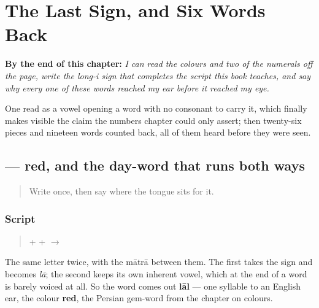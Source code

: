 
\chapter{The Last Sign, and Six Words Back}
\label{ch:bn-last-sign-six-words}

\begin{chapteropening}
\textbf{By the end of this chapter:} \emph{I can read the colours and two of the numerals off the page, write the long-i sign that completes the script this book teaches, and say why every one of these words reached my ear before it reached my eye.}

One read as a vowel opening a word with no consonant to carry it, which finally makes visible the claim the numbers chapter could only assert; then twenty-six pieces and nineteen words counted back, all of them heard before they were seen.
\end{chapteropening}

\section[\texorpdfstring{\bn{লাল} (lāl)}{লাল (lāl)}]{ — red, and the day-word that runs both ways}

\label{lesson:BN-W02-lal-read}



\begin{quote}
Write \textbf{} once, then say where the tongue sits for it.
\end{quote}

\subsection*{Script}
\begin{quote}
\textbf{} + \textbf{} + \textbf{} $\to$ \textbf{}
\end{quote}

The same letter twice, with the mātrā between them. The first \textbf{} takes the sign and becomes \emph{lā}; the second keeps its own inherent vowel, which at the end of a word is barely voiced at all. So the word comes out \textbf{lāl} — one syllable to an English ear, the colour \textbf{red}, the Persian gem-word from the chapter on colours.

